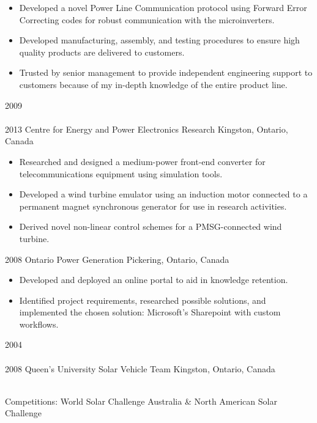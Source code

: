 \begin{entrylist}
{\begin{itemize}[leftmargin=12pt]
	\item Developed a novel Power Line Communication protocol using Forward Error Correcting codes for robust communication with the microinverters.
	\item Developed manufacturing, assembly, and testing procedures to ensure high quality products are delivered to customers.
	\item Trusted by senior management to provide independent engineering support to customers because of my in-depth knowledge of the entire product line.
\end{itemize}
}
\entry
  {2009\\\faChevronDown\\2013}
  {Centre for Energy and Power Electronics Research}
  {Kingston, Ontario, Canada}
  {
  \begin{itemize}[leftmargin=12pt]
    \item Researched and designed a medium-power front-end converter for telecommunications equipment using simulation tools.
    \item Developed a wind turbine emulator using an induction motor connected to a permanent magnet synchronous generator for use in research activities.
    \item Derived novel non-linear control schemes for a PMSG-connected wind turbine.
  \end{itemize}}
\entry
  {2008}
  {Ontario Power Generation}
  {Pickering, Ontario, Canada}
  {
  \begin{itemize}[leftmargin=12pt]
    \item Developed and deployed an online portal to aid in knowledge retention.
    \item Identified project requirements, researched possible solutions, and implemented the chosen solution: Microsoft's Sharepoint with custom workflows.
  \end{itemize}
}
\entry
  {2004\\\faChevronDown\\2008}
  {Queen's University Solar Vehicle Team}
  {Kingston, Ontario, Canada}
  {\\
  Competitions: {\bodyfontit World Solar Challenge Australia} \&
  {\bodyfontit North American Solar Challenge}
  \begin{itemize}[leftmargin=12pt]

\end{itemize}}
\end{entrylist}
